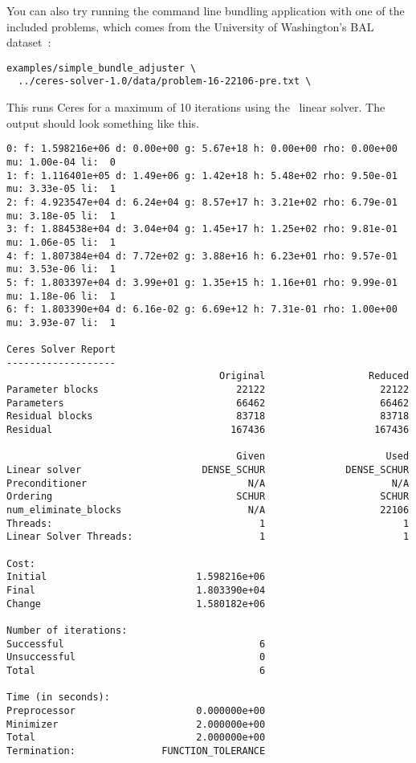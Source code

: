 You can also try running the command line bundling application with one of the
included problems, which comes from the University of Washington's BAL dataset~\cite{Agarwal10bal}:
\begin{verbatim}
examples/simple_bundle_adjuster \
  ../ceres-solver-1.0/data/problem-16-22106-pre.txt \
\end{verbatim}
This runs Ceres for a maximum of 10 iterations using the  \denseschur\ linear solver. The output should look something like this.
\clearpage
\begin{verbatim}
0: f: 1.598216e+06 d: 0.00e+00 g: 5.67e+18 h: 0.00e+00 rho: 0.00e+00 mu: 1.00e-04 li:  0
1: f: 1.116401e+05 d: 1.49e+06 g: 1.42e+18 h: 5.48e+02 rho: 9.50e-01 mu: 3.33e-05 li:  1
2: f: 4.923547e+04 d: 6.24e+04 g: 8.57e+17 h: 3.21e+02 rho: 6.79e-01 mu: 3.18e-05 li:  1
3: f: 1.884538e+04 d: 3.04e+04 g: 1.45e+17 h: 1.25e+02 rho: 9.81e-01 mu: 1.06e-05 li:  1
4: f: 1.807384e+04 d: 7.72e+02 g: 3.88e+16 h: 6.23e+01 rho: 9.57e-01 mu: 3.53e-06 li:  1
5: f: 1.803397e+04 d: 3.99e+01 g: 1.35e+15 h: 1.16e+01 rho: 9.99e-01 mu: 1.18e-06 li:  1
6: f: 1.803390e+04 d: 6.16e-02 g: 6.69e+12 h: 7.31e-01 rho: 1.00e+00 mu: 3.93e-07 li:  1

Ceres Solver Report
-------------------
                                     Original                  Reduced
Parameter blocks                        22122                    22122
Parameters                              66462                    66462
Residual blocks                         83718                    83718
Residual                               167436                   167436

                                        Given                     Used
Linear solver                     DENSE_SCHUR              DENSE_SCHUR
Preconditioner                            N/A                      N/A
Ordering                                SCHUR                    SCHUR
num_eliminate_blocks                      N/A                    22106
Threads:                                    1                        1
Linear Solver Threads:                      1                        1

Cost:
Initial                          1.598216e+06
Final                            1.803390e+04
Change                           1.580182e+06

Number of iterations:
Successful                                  6
Unsuccessful                                0
Total                                       6

Time (in seconds):
Preprocessor                     0.000000e+00
Minimizer                        2.000000e+00
Total                            2.000000e+00
Termination:               FUNCTION_TOLERANCE
\end{verbatim}

